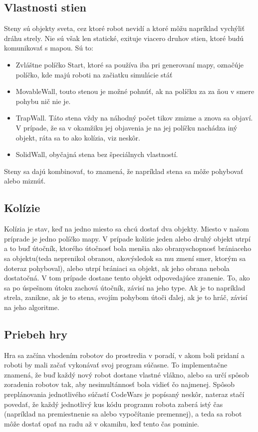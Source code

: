 \subsection{Vlastnosti stien} %
Steny sú objekty sveta, cez ktoré robot nevidí a ktoré môžu napríklad vychýliť dráhu strely. Nie sú však len statické, exituje viacero druhov stien, ktoré budú komunikovať s mapou. Sú to:\\
\begin{itemize}
\item Zvláštne políčko Start, ktoré sa používa iba pri generovaní mapy, označúje políčko, kde majú roboti na začiatku simulácie stáť 
\item MovableWall, touto stenou je možné pohnúť, ak na políčku za za ňou v smere pohybu nič nie je.
\item TrapWall. Táto stena vždy na náhodný počet tikov zmizne a znova sa objaví. V prípade, že sa v okamžiku jej objavenia je na jej políčku nachádza iný objekt, ráta sa to ako kolízia, viz neskôr.%
\item SolidWall, obyčajná stena bez špeciálnych vlastností.
\end {itemize}
Steny sa dajú kombinovať, to znamená, že napríklad stena sa môže pohybovať alebo miznúť. 

\subsection{Kolízie}\label{kolizie}
Kolízia je stav, keď na jedno miesto sa chcú dostať dva objekty. Miesto v našom príprade je jedno políčko mapy. V prípade kolízie jeden alebo druhý objekt utrpí a to buď útočník, ktorého útočnosť bola menšia ako obranyschopnosť brániaceho sa objektu(teda neprenikol obranou, akovýsledok sa mu zmení smer, ktorým sa doteraz pohyboval), alebo utrpí brániaci sa objekt, ak jeho obrana nebola dostatočná. V tom prípade dostane tento objekt odpovedajúce zranenie. To, ako sa po úspešnom útoku zachová útočník, závisí na jeho type. Ak je to napríklad strela, zanikne, ak je to stena, svojím pohybom útoči ďalej, ak je to hráč, závisí na jeho algoritme.

\subsection {Priebeh hry}
Hra sa začína vhodením robotov do prostredia v poradí, v akom boli pridaní a roboti by mali začať vykonávať svoj program súčasne. To implementačne znamená, že buď každý nový robot dostane vlastné vlákno, alebo sa určí spôsob zoradenia robotov tak, aby nesimultánnosť bola vidieť čo najmenej. Spôsob preplánovania jednotlivého súčastí CodeWars je popísaný neskôr, nateraz stačí povedať, že každý jednotlivý kus kódu programu robota zaberá istý čas (napríklad na premiestnenie sa alebo vypočítanie premennej), a teda sa robot môže dostať opať na radu až v okamihu, keď tento čas pominie. \\ %
